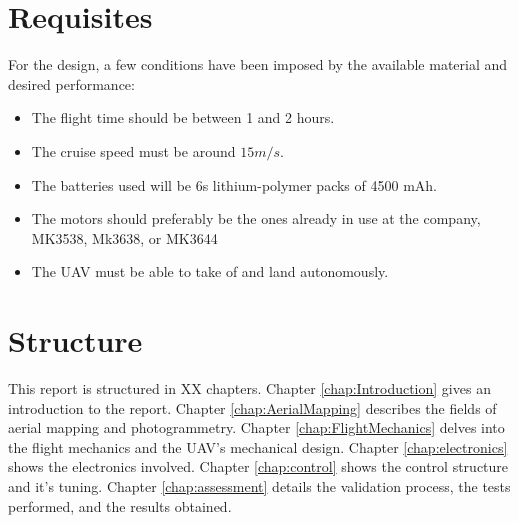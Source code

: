 \section{Requisites}

For the design, a few conditions have been imposed by the available material and desired performance:

\begin{itemize}

\item The flight time should be between 1 and 2 hours.
\item The cruise speed must be around $15 m/s$.
\item The batteries used will be 6s lithium-polymer packs of 4500 mAh.
\item The motors should preferably be the ones already in use at the company, MK3538, Mk3638, or MK3644
\item The UAV must be able to take of and land autonomously.

\end{itemize}


\section{Structure}
	
%
This report is structured in XX  chapters.
%
Chapter \ref{chap:Introduction} gives an introduction to the report.
%
Chapter \ref{chap:AerialMapping} describes the fields of aerial mapping and photogrammetry.
%
Chapter \ref{chap:FlightMechanics} delves into the flight mechanics and the UAV's mechanical design.
%
Chapter \ref{chap:electronics} shows the electronics involved.
%
Chapter \ref{chap:control} shows the control structure and it's tuning.
%
Chapter \ref{chap:assessment} details the validation process, the tests performed, and the results obtained.

